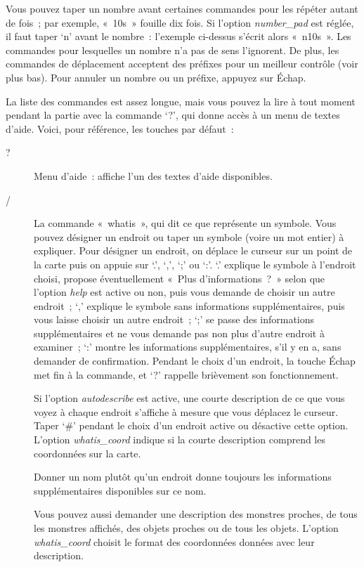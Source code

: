 \documentclass[titlepage]{article}
\begin{document}
Vous pouvez taper un nombre avant certaines commandes pour les répéter
autant de fois~; par exemple, «~10s~» fouille dix fois.
Si l'option
\textit{number\_pad}
est réglée, il faut taper `n' avant le nombre~: l'exemple ci-dessus
s'écrit alors «~n10s~».
Les commandes pour lesquelles un nombre n'a pas de sens l'ignorent.
De plus, les commandes de déplacement acceptent des préfixes pour un
meilleur contrôle (voir plus bas).
Pour annuler un nombre ou un préfixe, appuyez sur Échap.


La liste des commandes est assez longue, mais vous pouvez la lire à tout
moment pendant la partie avec la commande `?', qui donne accès à un
menu de textes d'aide.
Voici, pour référence, les touches par défaut~:

\begin{description}
\item[{?}]
Menu d'aide~: affiche l'un des textes d'aide disponibles.

\item[{/}]
La commande «~whatis~», qui dit ce que représente un symbole.
Vous pouvez désigner un endroit ou taper un symbole (voire un mot entier)
à expliquer.
Pour désigner un endroit, on déplace le curseur sur un point de la carte
puis on appuie sur `.', `,', `;' ou `:'.
`.' explique le symbole à l'endroit choisi, propose éventuellement
«~Plus d'informations~?~» selon que l'option
\textit{help}
est active ou non, puis vous demande de choisir un autre endroit~;
`,' explique le symbole sans informations supplémentaires, puis vous
laisse choisir un autre endroit~;
`;' se passe des informations supplémentaires et ne vous demande pas
non plus d'autre endroit à examiner~; `:' montre les informations
supplémentaires, s'il y en a, sans demander de confirmation.
Pendant le choix d'un endroit, la touche Échap met fin à la commande, et
`?' rappelle brièvement son fonctionnement.


Si l'option
\textit{autodescribe}
est active, une courte description de ce que vous voyez à chaque endroit
s'affiche à mesure que vous déplacez le curseur.
Taper `\#' pendant le choix d'un endroit active ou désactive cette
option.
L'option
\textit{whatis\_coord}
indique si la courte description comprend les coordonnées sur la carte.


Donner un nom plutôt qu'un endroit donne toujours les informations
supplémentaires disponibles sur ce nom.


Vous pouvez aussi demander une description des monstres proches, de tous
les monstres affichés, des objets proches ou de tous les objets.
L'option
\textit{whatis\_coord}
choisit le format des coordonnées données avec leur description.


\end{description}
\end{document}
